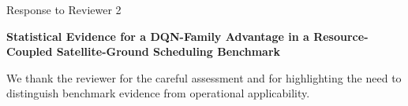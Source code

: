 

\begin{center}
{\Large Response to Reviewer 2}\par
\medskip
{\bfseries Statistical Evidence for a DQN-Family Advantage in a Resource-Coupled Satellite-Ground Scheduling Benchmark}
\end{center}

We thank the reviewer for the careful assessment and for highlighting the need to distinguish benchmark evidence from operational applicability.




